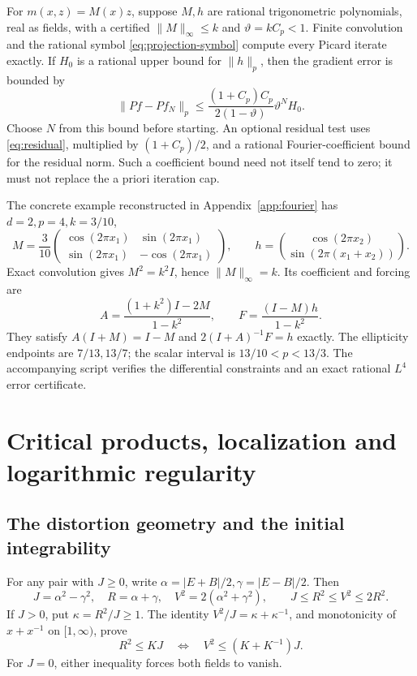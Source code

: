 \documentclass[11pt,a4paper]{article}
\numberwithin{equation}{section}
\theoremstyle{definition}
\theoremstyle{remark}\newtheorem{remark}[theorem]{Remark}
\newcommand{\Id}{I}
\newcommand{\norm}[1]{\lVert #1\rVert}
\begin{document}
For \(m(x,z)=M(x)z\), suppose \(M,h\) are rational trigonometric
polynomials, real as fields, with a certified \(\norm M_\infty\leq k\)
and \(\vartheta=kC_p<1\). Finite convolution and the rational symbol
\eqref{eq:projection-symbol} compute every Picard iterate exactly.
If \(H_0\) is a rational upper bound for \(\norm h_p\), then the gradient
error is bounded by
\begin{equation}\label{eq:fourier-cap}
 \norm{Pf-Pf_N}_p\leq
 \frac{(1+C_p)C_p}{2(1-\vartheta)}\vartheta^NH_0.
\end{equation}
Choose \(N\) from this bound before starting. An optional residual
test uses \eqref{eq:residual}, multiplied by \((1+C_p)/2\), and a
rational Fourier-coefficient bound for the residual norm.
Such a coefficient bound need not itself tend to zero; it must not
replace the a priori iteration cap.

The concrete example reconstructed in Appendix~\ref{app:fourier} has
\(d=2,p=4,k=3/10\),
\[
 M=\frac3{10}
 \begin{pmatrix}
 \cos(2\pi x_1)&\sin(2\pi x_1)\\
 \sin(2\pi x_1)&-\cos(2\pi x_1)
 \end{pmatrix},\qquad
 h=\binom{\cos(2\pi x_2)}{\sin(2\pi(x_1+x_2))}.
\]
Exact convolution gives \(M^2=k^2\Id\), hence
\(\norm M_\infty=k\). Its coefficient and forcing are
\[
 A=\frac{(1+k^2)\Id-2M}{1-k^2},\qquad
 F=\frac{(\Id-M)h}{1-k^2}.
\]
They satisfy \(A(\Id+M)=\Id-M\) and
\(2(\Id+A)^{-1}F=h\) exactly.
The ellipticity endpoints are \(7/13,13/7\); the scalar interval is
\(13/10<p<13/3\). The accompanying script verifies the differential
constraints and an exact rational \(L^4\) error certificate.



\section{Critical products, localization and logarithmic regularity}\label{sec:log}

\subsection{The distortion geometry and the initial integrability}

For any pair with \(J\geq0\), write
\(\alpha=|E+B|/2,\gamma=|E-B|/2\). Then
\[
 J=\alpha^2-\gamma^2,\quad R=\alpha+\gamma,\quad
 V^2=2(\alpha^2+\gamma^2),\qquad
 J\leq R^2\leq V^2\leq2R^2.
\]
If \(J>0\), put \(\kappa=R^2/J\geq1\). The identity
\(V^2/J=\kappa+\kappa^{-1}\), and monotonicity of
\(x+x^{-1}\) on \([1,\infty)\), prove
\[
 R^2\leq KJ
 \quad\Longleftrightarrow\quad
 V^2\leq(K+K^{-1})J.
\]
For \(J=0\), either inequality forces both fields to vanish.
\end{document}
